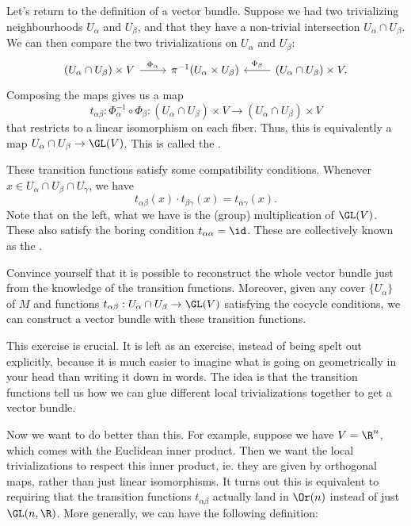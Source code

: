 \documentclass[a4paper]{article}
\begin{document}
Let's return to the definition of a vector bundle. Suppose we had two trivializing neighbourhoods $U_\alpha$ and $U_\beta$, and that they have a non-trivial intersection $U_\alpha \cap U_\beta$. We can then compare the two trivializations on $U_\alpha$ and $U_\beta$:
\[
  \begin{tikzcd}
    (U_\alpha \cap U_\beta) \times V \ar[r, "\Phi_\alpha"] & \pi^{-1}(U_\alpha \times U_\beta) & (U_\alpha \cap U_\beta) \times V \ar[l, "\Phi_\beta"'].
  \end{tikzcd}
\]
Composing the maps gives us a map
\[
  t_{\alpha\beta} : \Phi_\alpha^{-1} \circ \Phi_\beta: (U_\alpha \cap U_\beta) \times V \to (U_\alpha \cap U_\beta) \times V
\]
that restricts to a linear isomorphism on each fiber. Thus, this is equivalently a map $U_\alpha \cap U_\beta \to \GL(V)$. This is called the .

These transition functions satisfy some compatibility conditions. Whenever $x \in U_\alpha \cap U_\beta \cap U_\gamma$, we have
\[
  t_{\alpha\beta}(x) \cdot t_{\beta\gamma}(x) = t_{\alpha\gamma}(x).
\]
Note that on the left, what we have is the (group) multiplication of $\GL(V)$. These also satisfy the boring condition $t_{\alpha\alpha} = \id$. These are collectively known as the .

\begin{ex}
  Convince yourself that it is possible to reconstruct the whole vector bundle just from the knowledge of the transition functions. Moreover, given any cover $\{U_\alpha\}$ of $M$ and functions $t_{\alpha\beta}: U_\alpha \cap U_\beta \to \GL(V)$ satisfying the cocycle conditions, we can construct a vector bundle with these transition functions.
\end{ex}
This exercise is crucial. It is left as an exercise, instead of being spelt out explicitly, because it is much easier to imagine what is going on geometrically in your head than writing it down in words. The idea is that the transition functions tell us how we can glue different local trivializations together to get a vector bundle.

Now we want to do better than this. For example, suppose we have $V = \R^n$, which comes with the Euclidean inner product. Then we want the local trivializations to respect this inner product, ie. they are given by orthogonal maps, rather than just linear isomorphisms. It turns out this is equivalent to requiring that the transition functions $t_{\alpha\beta}$ actually land in $\Or(n)$ instead of just $\GL(n, \R)$. More generally, we can have the following definition:
\end{document}

